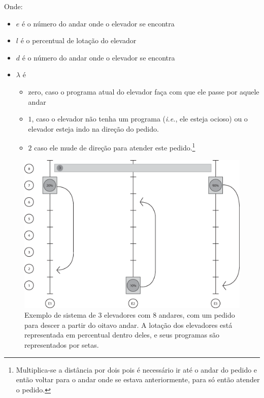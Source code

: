 Onde:
\begin{itemize}
\item \textbf{$e$} é o número do andar onde o elevador se encontra
\item \textbf{$l$} é o percentual de lotação do elevador
\item \textbf{$d$} é o número do andar onde o elevador se encontra
\item \textbf{$\lambda$} é
  \begin{itemize}
    \item zero, caso o programa atual do elevador faça com que ele passe por
      aquele andar
    \item $1$, caso o elevador não tenha um programa (\textit{i.e.},
      ele esteja ocioso) ou o elevador esteja indo na direção do pedido.
    \item $2$ caso ele mude de direção para atender este pedido.\footnote{Multiplica-se
        a distância por dois pois é necessário ir até o andar do pedido e então
        voltar para o andar onde se estava anteriormente, para só então atender
        o pedido.}
  \end{itemize}
\end{itemize}

\begin{figure}[htb!]
  \centering
  \includegraphics[scale=0.6]{img/elevator_example1.eps}
  \caption{Exemplo de sistema de 3 elevadores com 8 andares, com um pedido para
    descer a partir do oitavo andar. A lotação dos elevadores está representada
    em percentual dentro deles, e seus programas são representados por setas.}
  \label{fig:elevadores-1}
\end{figure}

